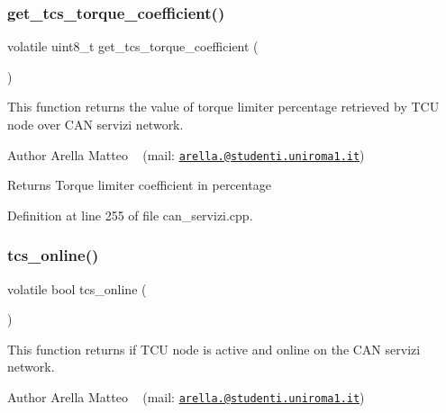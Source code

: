 \subsubsection{\texorpdfstring{get\+\_\+tcs\+\_\+torque\+\_\+coefficient()}{get\_tcs\_torque\_coefficient()}}
{\footnotesize\ttfamily volatile uint8\+\_\+t get\+\_\+tcs\+\_\+torque\+\_\+coefficient (\begin{DoxyParamCaption}{ }\end{DoxyParamCaption})}



This function returns the value of torque limiter percentage retrieved by T\+CU node over C\+AN servizi network. 

\begin{DoxyAuthor}{Author}
Arella Matteo ~\newline
 (mail\+: \href{mailto:arella.1646983@studenti.uniroma1.it}{\tt arella.@studenti.\+uniroma1.\+it})
\end{DoxyAuthor}
\begin{DoxyReturn}{Returns}
Torque limiter coefficient in percentage 
\end{DoxyReturn}


Definition at line 255 of file can\+\_\+servizi.\+cpp.

\mbox{\label{group___c_a_n__servizi__group_ga0c5f72386ae62e3e0b6908efa2fb2b28}} 
\subsubsection{\texorpdfstring{tcs\+\_\+online()}{tcs\_online()}}
{\footnotesize\ttfamily volatile bool tcs\+\_\+online (\begin{DoxyParamCaption}{ }\end{DoxyParamCaption})}



This function returns if T\+CU node is active and online on the C\+AN servizi network. 

\begin{DoxyAuthor}{Author}
Arella Matteo ~\newline
 (mail\+: \href{mailto:arella.1646983@studenti.uniroma1.it}{\tt arella.@studenti.\+uniroma1.\+it})
\end{DoxyAuthor}

